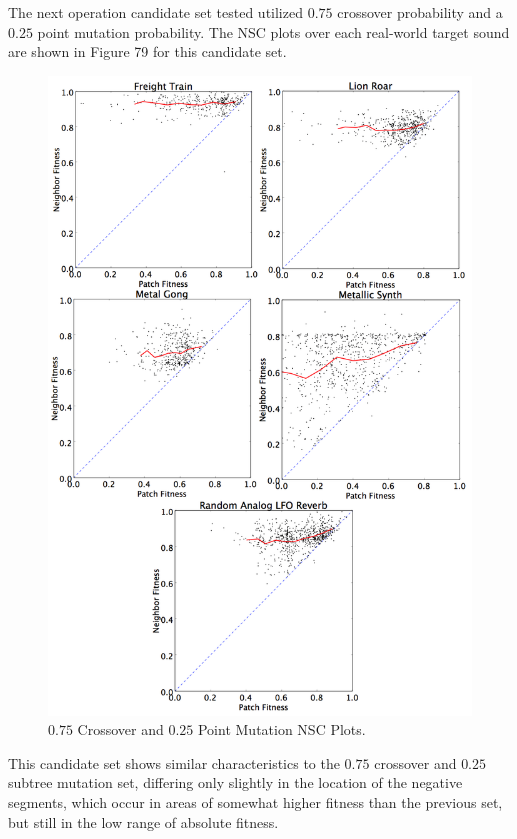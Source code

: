 \documentclass[12pt]{report} 	%
\numberwithin{figure}{chapter}
\numberwithin{table}{chapter}
\numberwithin{equation}{chapter}
\begin{document}
\begin{flushleft}
The next operation candidate set tested utilized $0.75$ crossover probability and a $0.25$ point mutation probability. The NSC plots over each real-world target sound are shown in Figure 79 for this candidate set.
\begin{figure}[h!]
\begin{center}
\includegraphics[scale=0.15]{GOPS_Param3}
\caption[$0.75$ Crossover and $0.25$ point mutation NSC plots]{$0.75$ Crossover and $0.25$ Point Mutation NSC Plots.}
\end{center}
\end{figure}

This candidate set shows similar characteristics to the $0.75$ crossover and $0.25$ subtree mutation set, differing only slightly in the location of the negative segments, which occur in areas of somewhat higher fitness than the previous set, but still in the low range of absolute fitness.


\end{flushleft}
\end{document}
